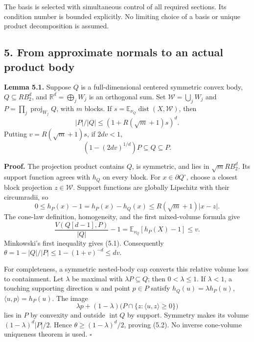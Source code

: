 \documentclass[
  11pt,
]{article}
\begin{document}
The basis is selected with simultaneous control of all required
sections. Its condition number is bounded explicitly. No limiting choice
of a basis or unique product decomposition is assumed.

\subsection{5. From approximate normals to an actual product
body}\label{from-approximate-normals-to-an-actual-product-body}

\textbf{Lemma 5.1.} Suppose \(Q\) is a full-dimensional centered
symmetric convex body, \(Q\subseteq R B_2^d\), and
\(\mathbb R^d=\bigoplus_jW_j\) is an orthogonal sum. Set
\(\mathcal W=\bigcup_jW_j\) and \(P=\prod_j\operatorname{proj}_{W_j}Q\),
with \(m\) blocks. If
\(s=\mathbb E_{\nu_Q}\operatorname{dist}(X,\mathcal W)\), then \[
 |P|/|Q|\le(1+R(\sqrt m+1)s)^d.                               \tag{5.1}
\] Putting \(v=R(\sqrt m+1)s\), if \(2dv<1\), \[
 (1-(2dv)^{1/d})P\subseteq Q\subseteq P.                       \tag{5.2}
\]

\textbf{Proof.} The projection product contains \(Q\), is symmetric, and
lies in \(\sqrt m R B_2^d\). Its support function agrees with \(h_Q\) on
every block. For \(x\in\partial Q^\circ\), choose a closest block
projection \(z\in\mathcal W\). Support functions are globally Lipschitz
with their circumradii, so \[
 0\le h_P(x)-1=h_P(x)-h_Q(x)
 \le R(\sqrt m+1)|x-z|.
\] The cone-law definition, homogeneity, and the first mixed-volume
formula give \[
 \frac{V(Q[d-1],P)}{|Q|}-1
 =\mathbb E_{\nu_Q}[h_P(X)-1]\le v.
\] Minkowski's first inequality gives (5.1). Consequently
\(\theta=1-|Q|/|P|\le1-(1+v)^{-d}\le dv\).

For completeness, a symmetric nested-body cap converts this relative
volume loss to containment. Let \(\lambda\) be maximal with
\(\lambda P\subseteq Q\); then \(0<\lambda\le1\). If \(\lambda<1\), a
touching supporting direction \(u\) and point \(p\in P\) satisfy
\(h_Q(u)=\lambda h_P(u)\), \(\langle u,p\rangle=h_P(u)\). The image \[
 \lambda p+(1-\lambda)\bigl(P\cap\{z:\langle u,z\rangle\ge0\}\bigr)
\] lies in \(P\) by convexity and outside \(\operatorname{int}Q\) by
support. Symmetry makes its volume \((1-\lambda)^d|P|/2\). Hence
\(\theta\ge(1-\lambda)^d/2\), proving (5.2). No inverse cone-volume
uniqueness theorem is used. \(\square\)
\end{document}
